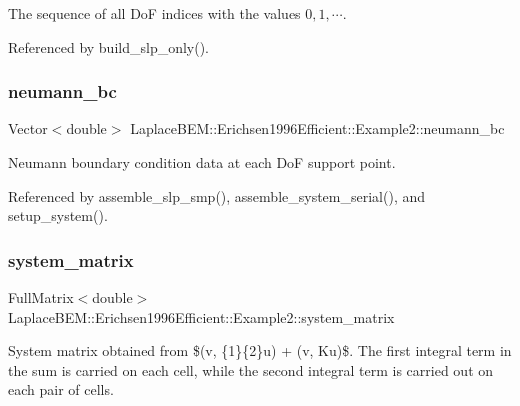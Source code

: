The sequence of all DoF indices with the values $0, 1, \cdots$. 

Referenced by build\+\_\+slp\+\_\+only().

\mbox{\label{classLaplaceBEM_1_1Erichsen1996Efficient_1_1Example2_a52203aaab49947b16cf4f1a46f245375}} 
\subsubsection{\texorpdfstring{neumann\+\_\+bc}{neumann\_bc}}
{\footnotesize\ttfamily Vector$<$double$>$ Laplace\+B\+E\+M\+::\+Erichsen1996\+Efficient\+::\+Example2\+::neumann\+\_\+bc\hspace{0.3cm}{\ttfamily [private]}}

Neumann boundary condition data at each DoF support point. 

Referenced by assemble\+\_\+slp\+\_\+smp(), assemble\+\_\+system\+\_\+serial(), and setup\+\_\+system().

\mbox{\label{classLaplaceBEM_1_1Erichsen1996Efficient_1_1Example2_a9c76773c78cc3a09eb1f7e4f9d44d0c8}} 
\subsubsection{\texorpdfstring{system\+\_\+matrix}{system\_matrix}}
{\footnotesize\ttfamily Full\+Matrix$<$double$>$ Laplace\+B\+E\+M\+::\+Erichsen1996\+Efficient\+::\+Example2\+::system\+\_\+matrix\hspace{0.3cm}{\ttfamily [private]}}

System matrix obtained from \$(v, \{1\}\{2\}u) + (v, Ku)\$. The first integral term in the sum is carried on each cell, while the second integral term is carried out on each pair of cells. 

